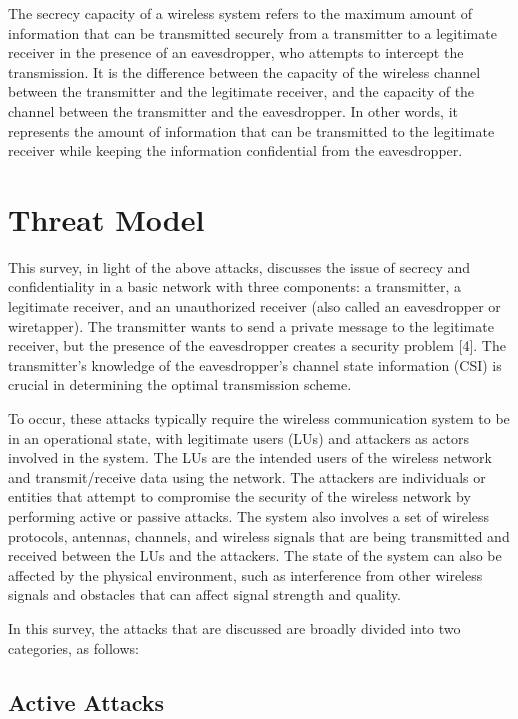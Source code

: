 \documentclass[conference]{IEEEtran}
\begin{document}
The secrecy capacity of a wireless system refers to the maximum amount of information that can be transmitted securely from a transmitter to a legitimate receiver in the presence of an eavesdropper, who attempts to intercept the transmission. It is the difference between the capacity of the wireless channel between the transmitter and the legitimate receiver, and the capacity of the channel between the transmitter and the eavesdropper. In other words, it represents the amount of information that can be transmitted to the legitimate receiver while keeping the information confidential from the eavesdropper.

\section{Threat Model}
This survey, in light of the above attacks, discusses the issue of secrecy and confidentiality in a basic network with three components: a transmitter, a legitimate receiver, and an unauthorized receiver (also called an eavesdropper or wiretapper). The transmitter wants to send a private message to the legitimate receiver, but the presence of the eavesdropper creates a security problem [4]. The transmitter's knowledge of the eavesdropper's channel state information (CSI) is crucial in determining the optimal transmission scheme.

To occur, these attacks typically require the wireless communication system to be in an operational state, with legitimate users (LUs) and attackers as actors involved in the system. The LUs are the intended users of the wireless network and transmit/receive data using the network. The attackers are individuals or entities that attempt to compromise the security of the wireless network by performing active or passive attacks. The system also involves a set of wireless protocols, antennas, channels, and wireless signals that are being transmitted and received between the LUs and the attackers. The state of the system can also be affected by the physical environment, such as interference from other wireless signals and obstacles that can affect signal strength and quality.

In this survey, the attacks that are discussed are broadly divided into two categories, as follows:

\subsection{Active Attacks}\label{AA}
\end{document}
